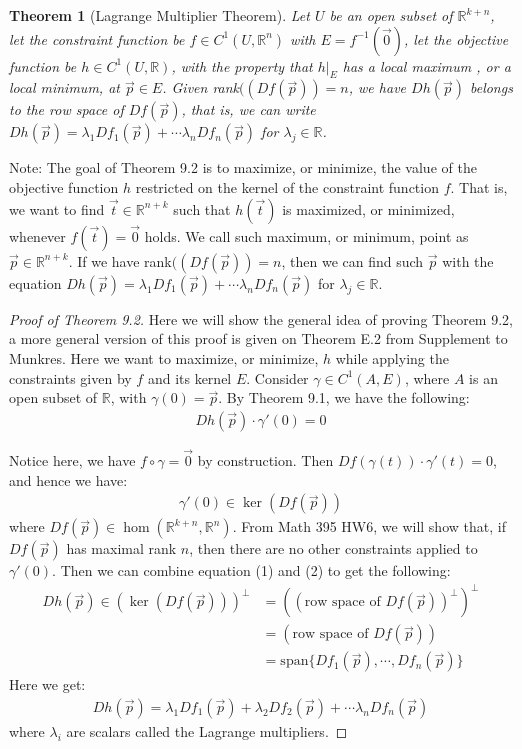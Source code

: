 \documentclass[11pt,oneside]{book}
\theoremstyle{break}
\theoremstyle{break}
\newtheorem{thm}{Theorem}[section]
\newcommand{\R}{\mathbb{R}}
\newcommand{\spa}{\text{span}}
\newcommand{\note}{\color{red}Note: \color{black}}
\begin{document}
\begin{thm}[Lagrange Multiplier Theorem]
Let $U$ be an open subset of $\R^{k+n}$, let the constraint function be $f\in C^1(U,\R^n)$ with $E=f^{-1}(\vec{0})$, let the objective function be $h\in C^1(U,\R)$, with the property that $h|_E$ has a local maximum , or a local minimum, at $\vec{p}\in E$. Given rank$((Df(\vec{p})) = n$, we have $Dh(\vec{p})$ belongs to the row space of $Df(\vec{p})$, that is, we can write $Dh(\vec{p}) = \lambda_1 Df_1(\vec{p}) + \cdots \lambda_n Df_n(\vec{p})$ for $\lambda_j \in \R$.
\end{thm}

\note The goal of Theorem 9.2 is to maximize, or minimize, the value of the objective function $h$ restricted on the kernel of the constraint function $f$. That is, we want to find $\vec{t}\in \R^{n+k}$ such that $h(\vec{t})$ is maximized, or minimized, whenever $f(\vec{t}) = \vec{0}$ holds. We call such maximum, or minimum, point as $\vec{p}\in \R^{n+k}$. If we have rank$((Df(\vec{p})) = n$, then we can find such $\vec{p}$ with the equation $Dh(\vec{p}) = \lambda_1 Df_1(\vec{p}) + \cdots \lambda_n Df_n(\vec{p})$ for $\lambda_j \in \R$.

\begin{proof}[Proof of Theorem 9.2]
Here we will show the general idea of proving Theorem 9.2, a more general version of this proof is given on Theorem E.2 from Supplement to Munkres. Here we want to maximize, or minimize, $h$ while applying the constraints given by $f$ and its kernel $E$. Consider $\gamma \in C^1(A,E)$, where $A $ is an open subset of $\R$, with $\gamma(0) = \vec{p}$. By Theorem 9.1, we have the following:
\begin{align*}
Dh(\vec{p}) \cdot \gamma' (0) = 0 \tag{1}
\end{align*}

Notice here, we have $f\circ \gamma = \vec{0}$ by construction. Then $Df(\gamma(t)) \cdot \gamma' (t) = 0$, and hence we have:
\begin{align*}
\gamma'(0) \in \ker(Df(\vec{p})) \tag{2}
\end{align*}
where $Df(\vec{p}) \in \hom(\R^{k+n},\R^n)$. From Math 395 HW6, we will show that, if $Df(\vec{p})$ has maximal rank $n$, then there are no other constraints applied to $\gamma'(0)$. Then we can combine equation (1) and (2) to get the following: 
\begin{align*}
Dh(\vec{p}) \in (\ker(Df(\vec{p})))^\perp &= ((\text{row space of }Df(\vec{p}))^\perp)^\perp \\&= (\text{row space of }Df(\vec{p})) \\&= \spa\{Df_1(\vec{p}),\cdots, Df_n(\vec{p})\}
\end{align*}
Here we get: 
\begin{align*}
Dh(\vec{p}) = \lambda_1 Df_1(\vec{p})+ \lambda_2 Df_2(\vec{p}) + \cdots \lambda_n Df_n(\vec{p}) \tag{3}
\end{align*}
where $\lambda_i$ are scalars called the Lagrange multipliers.
\end{proof}
\end{document}
